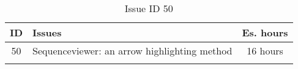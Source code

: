 \begin{longtable} { | c | p{12cm} | c | } 
\hline
	ID 	&	Issues	&		 Es. hours \\\hline
	50 	&	Sequenceviewer: an arrow highlighting method	&	16 hours \\\hline
\caption{Issue ID 50}
\label{tab:spr3_SVarrowhighlight}
\end{longtable}